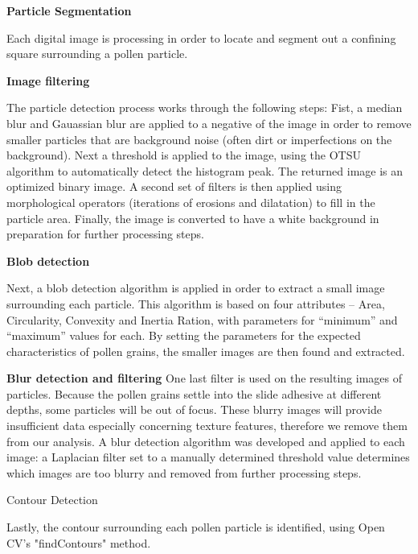 \textbf{Particle Segmentation} 

Each digital image is processing in order to locate and segment out a confining square surrounding a pollen particle. 

\textbf{Image filtering}

The particle detection process works through the following steps: Fist, a median blur and Gauassian blur are applied to a negative of the image in order to remove smaller particles that are background noise (often dirt or imperfections on the background). 
Next a threshold is applied to the image, using the OTSU algorithm to automatically detect the histogram peak. The returned image is an optimized binary image. A second set of filters is then applied using morphological operators (iterations of erosions and dilatation) to fill in the particle area. Finally, the image is converted to have a white background in preparation for further processing steps.


\textbf{Blob detection}

Next, a blob detection algorithm is applied in order to extract a small image surrounding each particle. This algorithm is based on four attributes – Area, Circularity, Convexity and Inertia Ration, with parameters for “minimum” and “maximum” values for each. By setting the parameters for the expected characteristics of pollen grains, the smaller images are then found and extracted.

\textbf{Blur detection and filtering}
One last filter is used on the resulting images of particles. Because the pollen grains settle into the slide adhesive at different depths, some particles will be out of focus. These blurry images will provide insufficient data especially concerning texture features, therefore we remove them from our analysis. A blur detection algorithm was developed and applied to each image: a Laplacian filter set to a manually determined threshold value determines which images are too blurry and removed from further processing steps. 

Contour Detection

Lastly, the contour surrounding each pollen particle is identified, using Open CV's "findContours" method. 

    
    
    
    
  
  
  
  
  
